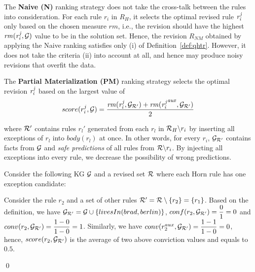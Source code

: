 The \textbf{Naive (N)} ranking strategy does not take the cross-talk between the rules into consideration. For each rule $r_i$ in $R_H$, it selects the optimal revised rule $\mathit{r^j_i}$ only based on the chosen measure $rm$, i.e., the revision should have the highest $\mathit{rm(r^j_{i},\mathcal{G})}$ value to be in the solution set. Hence, the revision $R_{NM}$ obtained by applying the Naive ranking satisfies only (i) of Definition~\ref{def:qhtr}. However, it does not take the criteria (ii) into account at all, and hence may produce noisy revisions that overfit the data.

The \textbf{Partial Materialization (PM)} ranking strategy selects the optimal revision $\mathit{r^j_i}$ based on the largest value of
\begin{equation}
\label{pm}
score(r^j_i,\mathcal{G})=\dfrac{\mathit{rm(r^j_i,\mathcal{G}_{\mathcal{R}'})+rm({r^j_i}^{aux},\mathcal{G}_{\mathcal{R}'})}}{2}
\end{equation}

\noindent where $\mathcal{R}'$ contains rules $r_l'$ generated from each $r_l$ in $\mathcal{R}_H\backslash r_i$ by inserting all exceptions of $r_l$ into $body(r_l)$ at once. In other words, for every $r_i$, $\mathcal{G}_{\mathcal{R}'}$ contains facts from $\mathcal{G}$ and \textit{safe predictions} of all rules from $\mathcal{R} \backslash r_i$. By injecting all exceptions into every rule, we decrease the possibility of wrong predictions.

\begin{example}\label{ex:as}
Consider the following KG $\mathcal{G}$ and a revised set $\mathcal{R}$ where each Horn rule has one exception candidate:\\
{\small {}}
{\small {}}            
\normalsize
{\smallskip

\noindent            

Consider the rule $r_2$ and a set of other rules $\mathcal{R}' = \mathcal{R} \setminus \{r_2\} = \{r_1\}$. Based on the definition, we have $\mathcal{G}_{\mathcal{R}'} = \mathcal{G} \cup \{livesIn(brad,berlin)\}$, $conf(r_2, \mathcal{G}_{\mathcal{R}'}) = \dfrac{0}{1} = 0$ and $conv(r_2, \mathcal{G}_{\mathcal{R}'}) = \dfrac{1 - 0}{1 - 0} = 1$. Similarly, we have $conv(r_2^{aux}, \mathcal{G}_{\mathcal{R}'}) = \dfrac{1 - 1}{1 - 0} = 0$, hence, $score(r_2, \mathcal{G}_{\mathcal{R}'})$ is the average of two above conviction values and equals to $0.5$.
}\qed
\end{example}

